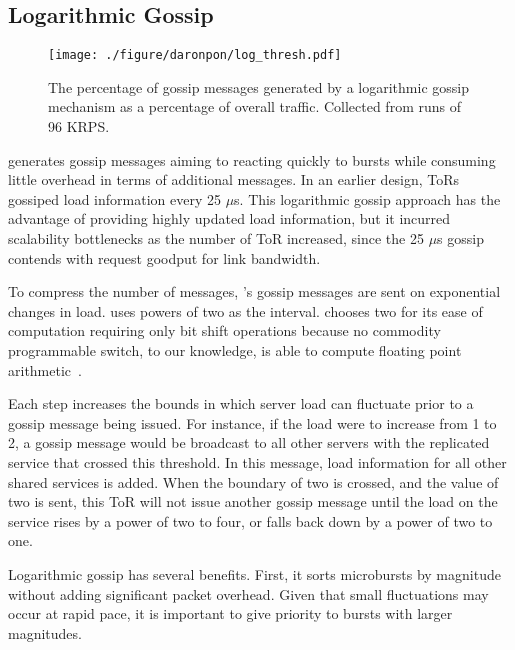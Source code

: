 \subsection{Logarithmic Gossip}
\label{darapon:sec:design:gossip}

\begin{figure}[t]
  \centering
    \texttt{[image: ./figure/daronpon/log\_thresh.pdf]}
    \centering
    \caption{The percentage of gossip messages generated by a
    logarithmic gossip mechanism as a percentage of overall traffic.
    Collected from runs of 96 KRPS.} 
  \label{fig:log_thresh}
\end{figure}

\daronpon generates gossip messages aiming to reacting quickly to bursts while consuming little overhead in terms of additional messages.  
%
In an earlier design, ToRs gossiped load information every 25 $\mu$s. 
%
This logarithmic gossip approach has the advantage of providing highly updated load information, but it incurred scalability bottlenecks as the number of ToR increased, since the 25 $\mu$s gossip contends with request goodput for link bandwidth.

To compress the number of messages, \daronpon's gossip messages are sent
on exponential changes in load. 
%
\daronpon uses powers of two as the interval. 
%
\daronpon chooses two for its ease of computation requiring only bit shift operations because no commodity programmable switch, to our knowledge, is able to compute floating point arithmetic~\cite{challenging_programable}.

Each step increases the bounds in which server load can fluctuate
prior to a gossip message being issued. 
%
For instance, if the load were to
increase from 1 to 2, a gossip message would be broadcast to all other servers
with the replicated service that crossed this threshold.
%
In this message, load information for all other shared services is added. When the boundary of two is crossed, and the value of two is sent, this ToR will not issue another gossip message until the load on the service rises by a power of two to four, or falls back down by a power of two to one.

Logarithmic gossip has several benefits. 
%
First, it sorts microbursts by magnitude without adding significant packet overhead. Given that small fluctuations may occur at rapid pace, it is important to give priority to bursts with larger magnitudes.
%


